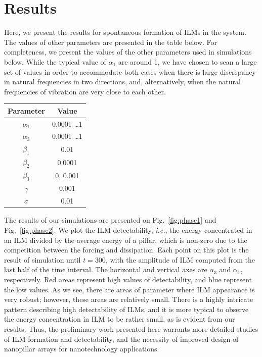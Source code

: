 \documentclass[12pt]{report}
\begin{document}
\section{Results} 
Here, we present the results for spontaneous formation of ILMs in the system.  The values of other parameters are presented in the table below. For completeness, we present the values of the other parameters used in simulations below. 
While the typical value of $\alpha_1$ are around 1, we have chosen to scan a large set of values in order to accommodate both cases when there is large discrepancy in natural frequencies in two directions, and, alternatively, when the 
natural frequencies of vibration are very close to each other.  
\begin{center}
\begin{tabular}{|c|c|}
\hline Parameter & Value \\
\hline
 $\alpha_1$ & 0.0001 \ldots 1 \\
 \hline 
 $\alpha_3$ & 0.0001 \ldots 1 \\
 \hline 
 $\beta_1$ & 0.01  \\
 \hline 
 $\beta_2$ & 0.0001 \\
 \hline 
 $\beta_3$ & 0, 0.001 \\
\hline
$\gamma$ & 0.001 \\
\hline 
$\sigma$ & 0.01 \\
\hline 
\end{tabular}
\end{center}

The results of our simulations are presented on Fig.~\ref{fig:phase1} and Fig.~\ref{fig:phase2}. We plot the ILM detectability, \emph{i.e.}, the energy concentrated in an ILM divided by the average energy of a pillar, which is non-zero due to the competition between the forcing and dissipation.  Each point on this plot is the result of simulation until $t=300$, with the amplitude of ILM computed from the last half of the time interval. The horizontal and vertical axes are $\alpha_3$ and $\alpha_1$, respectively. Red areas represent high values of detectability, and blue represent the low values. As we see, there are areas of parameter where ILM appearance is very robust; however, these areas are relatively small.  There is a highly intricate pattern describing high detectability of ILMs, and it is more typical to observe the energy concentration in ILM to be rather small, as is evident from our results. Thus, the preliminary work presented here warrants more detailed studies of ILM formation and detectability, and the necessity of improved design of nanopillar arrays for nanotechnology applications. 
\end{document}
